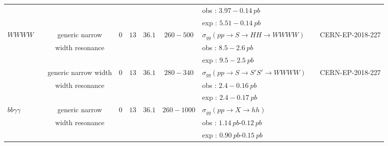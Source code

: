 \begin{table}[h!]
{\begin{tabular}{|l|l|c|c|c|c|c|l|c|c|}
                    &        &                &    &        &        &            &obs : $3.97-0.14\ pb$                                    &    &\\
                    &        &                &    &        &        &            &exp : $5.51-0.14\ pb$                                    &    &\\
\hline
$WW WW$                    &        &generic narrow         &0    &$13$        &$36.1$        &$260-500$        &$\sigma_{gg}(pp\rightarrow S\rightarrow HH\rightarrow WWWW)$     &    &CERN-EP-2018-227\\
                    &        &width resonance        &    &        &        &            &obs : $8.5-2.6\ pb$        &     &\\
                    &        &                &    &        &        &            &exp : $9.5-2.5\ pb$        &     &\\
\cline{3-10}
                    &        &generic narrow width         &0    &$13$        &$36.1$        &$280-340$        &$\sigma_{gg}(pp\rightarrow S\rightarrow S'S'\rightarrow WWWW)$     &    &CERN-EP-2018-227\\
                    &        &width resonance        &    &        &        &            &obs : $2.4-0.16\ pb$        &     &\\
                    &        &                &    &        &        &            &exp : $2.4-0.17\ pb$        &     &\\



\hline
$bb \gamma\gamma$            &        &generic narrow         &0    &$13$        &$36.1$        &$260-1000$        &$\sigma_{gg}(pp\rightarrow X\rightarrow hh)$     &    &\cite{Aaboud:2018ftw}\\
                    &        &width resonance        &    &        &        &            &obs : $1.14\ pb$-$0.12\ pb$    &     &\\
                    &        &                &    &        &        &            &exp : $0.90\ pb$-$0.15\ pb$    &     &\\


\end{tabular}}
\end{table}
